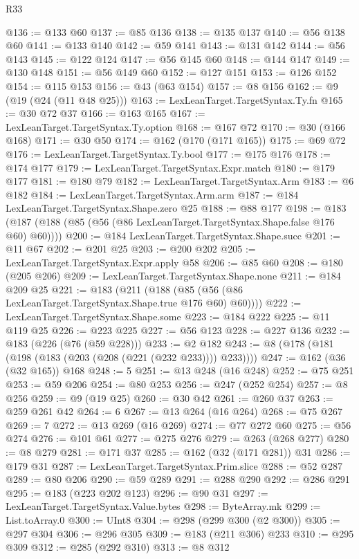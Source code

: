 \begin{lexlean}{R33}
\begin{coremodule}
@136 := @133 @60
@137 := @85 @136
@138 := @135 @137
@140 := @56 @138 @60
@141 := @133 @140
@142 := @59 @141
@143 := @131 @142
@144 := @56 @143
@145 := @122 @124
@147 := @56 @145 @60
@148 := @144 @147
@149 := @130 @148
@151 := @56 @149 @60
@152 := @127 @151
@153 := @126 @152
@154 := @115 @153
@156 := @43 (@63 @154)
@157 := @8 @156
@162 := @9 (@19 (@24 (@11 @48 @25)))
@163 := LexLeanTarget.TargetSyntax.Ty.fn
@165 := @30 @72 @37
@166 := @163 @165
@167 := LexLeanTarget.TargetSyntax.Ty.option
@168 := @167 @72
@170 := @30 (@166 @168)
@171 := @30 @50
@174 := @162 (@170 (@171 @165))
@175 := @69 @72
@176 := LexLeanTarget.TargetSyntax.Ty.bool
@177 := @175 @176
@178 := @174 @177
@179 := LexLeanTarget.TargetSyntax.Expr.match
@180 := @179 @177
@181 := @180 @79
@182 := LexLeanTarget.TargetSyntax.Arm
@183 := @6 @182
@184 := LexLeanTarget.TargetSyntax.Arm.arm
@187 := @184 LexLeanTarget.TargetSyntax.Shape.zero @25
@188 := @88 @177
@198 := @183 (@187 (@188 (@85 (@56 (@86 LexLeanTarget.TargetSyntax.Shape.false @176 @60) @60))))
@200 := @184 LexLeanTarget.TargetSyntax.Shape.succ
@201 := @11 @67
@202 := @201 @25
@203 := @200 @202
@205 := LexLeanTarget.TargetSyntax.Expr.apply @58
@206 := @85 @60
@208 := @180 (@205 @206)
@209 := LexLeanTarget.TargetSyntax.Shape.none
@211 := @184 @209 @25
@221 := @183 (@211 (@188 (@85 (@56 (@86 LexLeanTarget.TargetSyntax.Shape.true @176 @60) @60))))
@222 := LexLeanTarget.TargetSyntax.Shape.some
@223 := @184 @222
@225 := @11 @119 @25
@226 := @223 @225
@227 := @56 @123
@228 := @227 @136
@232 := @183 (@226 (@76 (@59 @228)))
@233 := @2 @182
@243 := @8 (@178 (@181 (@198 (@183 (@203 (@208 (@221 (@232 @233)))) @233))))
@247 := @162 (@36 (@32 @165)) @168
@248 := 5
@251 := @13 @248 (@16 @248)
@252 := @75 @251
@253 := @59 @206
@254 := @80 @253
@256 := @247 (@252 @254)
@257 := @8 @256
@259 := @9 (@19 @25)
@260 := @30 @42
@261 := @260 @37
@263 := @259 @261 @42
@264 := 6
@267 := @13 @264 (@16 @264)
@268 := @75 @267
@269 := 7
@272 := @13 @269 (@16 @269)
@274 := @77 @272 @60
@275 := @56 @274
@276 := @101 @61
@277 := @275 @276
@279 := @263 (@268 @277)
@280 := @8 @279
@281 := @171 @37
@285 := @162 (@32 (@171 @281)) @31
@286 := @179 @31
@287 := LexLeanTarget.TargetSyntax.Prim.slice
@288 := @52 @287
@289 := @80 @206
@290 := @59 @289
@291 := @288 @290
@292 := @286 @291
@295 := @183 (@223 @202 @123)
@296 := @90 @31
@297 := LexLeanTarget.TargetSyntax.Value.bytes
@298 := ByteArray.mk
@299 := List.toArray.{0}
@300 := UInt8
@304 := @298 (@299 @300 (@2 @300))
@305 := @297 @304
@306 := @296 @305
@309 := @183 (@211 @306) @233
@310 := @295 @309
@312 := @285 (@292 @310)
@313 := @8 @312

\end{coremodule}
\end{lexlean}
